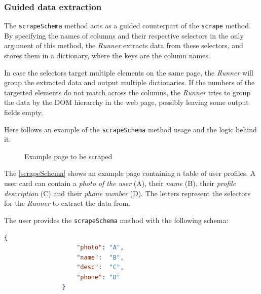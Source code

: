\subsubsection{Guided data extraction}

The \texttt{scrapeSchema} method acts as a guided counterpart of the \texttt{scrape} method.
By specifying the names of columns and their respective selectors in the only argument of this method, 
the \textit{Runner} extracts data from these selectors, and stores them in a dictionary, where the keys are the column names.

In case the selectors target multiple elements on the same page, the \textit{Runner} will group the extracted data and output multiple dictionaries.
If the numbers of the targetted elements do not match across the columns, the \textit{Runner} tries to group the data by the \acs{DOM} hierarchy in the web page, possibly leaving some output fields empty.

Here follows an example of the \texttt{scrapeSchema} method usage and the logic behind it.

\begin{figure}[!h]
    \begin{center}
    \end{center}
    \caption{Example page to be scraped}\label{scrapeSchema}
\end{figure}

The \autoref{scrapeSchema} shows an example page containing a table of user profiles. 
A user card can contain a \textit{photo of the user} (A), their \textit{name} (B), their \textit{profile description} (C) and their \textit{phone number} (D).
The letters represent the selectors for the \textit{Runner} to extract the data from.

The user provides the \texttt{scrapeSchema} method with the following schema:
    \begin{lstlisting}[language=json]
                {
                    "photo": "A",
                    "name":  "B",
                    "desc":  "C",
                    "phone": "D"
                }
    \end{lstlisting}

